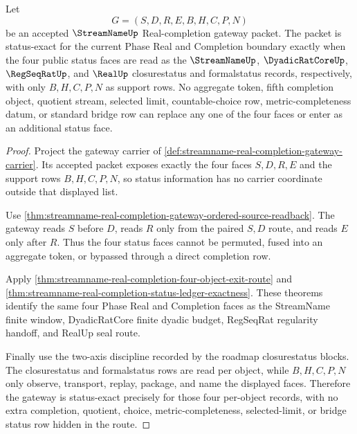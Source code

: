 \begin{theorem}
\label{thm:streamname-real-completion-gateway-status-exactness}
Let
$$
G=(S,D,R,E,B,H,C,P,N)
$$
be an accepted $\StreamNameUp$ Real-completion gateway packet. The packet is status-exact for the current Phase Real and Completion boundary exactly when the four public status faces are read as the $\StreamNameUp$, $\DyadicRatCoreUp$, $\RegSeqRatUp$, and $\RealUp$ closurestatus and formalstatus records, respectively, with only $B,H,C,P,N$ as support rows. No aggregate token, fifth completion object, quotient stream, selected limit, countable-choice row, metric-completeness datum, or standard bridge row can replace any one of the four faces or enter as an additional status face.
\end{theorem}
\begin{proof}
Project the gateway carrier of \autoref{def:streamname-real-completion-gateway-carrier}. Its accepted packet exposes exactly the four faces $S,D,R,E$ and the support rows $B,H,C,P,N$, so status information has no carrier coordinate outside that displayed list.

Use \autoref{thm:streamname-real-completion-gateway-ordered-source-readback}. The gateway reads $S$ before $D$, reads $R$ only from the paired $S,D$ route, and reads $E$ only after $R$. Thus the four status faces cannot be permuted, fused into an aggregate token, or bypassed through a direct completion row.

Apply \autoref{thm:streamname-real-completion-four-object-exit-route} and \autoref{thm:streamname-real-completion-status-ledger-exactness}. These theorems identify the same four Phase Real and Completion faces as the StreamName finite window, DyadicRatCore finite dyadic budget, RegSeqRat regularity handoff, and RealUp seal route.

Finally use the two-axis discipline recorded by the roadmap closurestatus blocks. The closurestatus and formalstatus rows are read per object, while $B,H,C,P,N$ only observe, transport, replay, package, and name the displayed faces. Therefore the gateway is status-exact precisely for those four per-object records, with no extra completion, quotient, choice, metric-completeness, selected-limit, or bridge status row hidden in the route.
\end{proof}

